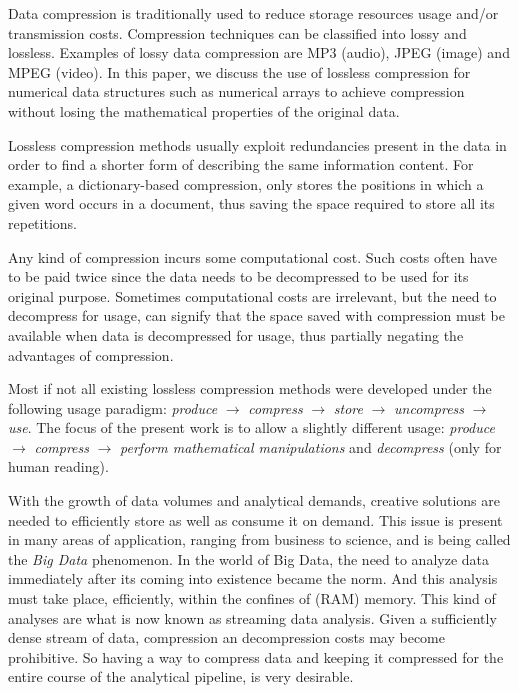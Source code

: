 \documentclass[10pt]{article}
\begin{document}
Data compression is traditionally used to reduce storage resources usage and/or 
transmission costs\cite{salomon}. Compression techniques can be classified into 
lossy and lossless. Examples of lossy data compression are MP3 (audio), JPEG 
(image) and MPEG (video). In this paper, we discuss the use of lossless 
compression for numerical data structures such as numerical arrays to achieve 
compression without losing the mathematical properties of the original data.

Lossless compression methods usually exploit redundancies present in the data in 
order to find a shorter form of describing the same information content. For 
example, a dictionary-based compression, only stores the positions in which a 
given word occurs in a document, thus saving the space required to store all its 
repetitions\cite{salomon2}.  

Any kind of compression incurs some computational cost. Such costs often have to 
be paid twice since the data needs to be decompressed to be used for its 
original purpose. Sometimes computational costs are irrelevant, but the need to 
decompress for usage, can signify that the space saved with compression must be 
available when data is decompressed for usage, thus partially negating the 
advantages of compression. 

Most if not all existing lossless compression methods were developed under the 
following usage paradigm: \textit{produce} $\rightarrow$ \textit{compress} 
$\rightarrow$ \textit{store} $\rightarrow$ \textit{uncompress} $\rightarrow$ 
\textit{use}. The focus of the present work is to allow a slightly different 
usage:  \textit{produce} $\rightarrow$ \textit{compress} $\rightarrow$ 
\textit{perform mathematical manipulations} and \textit{decompress} (only for 
human reading). 

With the growth of data volumes and analytical demands, creative solutions are 
needed to efficiently store as well as consume it on demand. This issue is 
present in many areas of application, ranging from business to 
science\cite{lynch}, and is being called the \textit{Big Data} phenomenon. In 
the world of Big Data, the need to analyze data immediately after its coming 
into existence became the norm. And this analysis must take place, efficiently, 
within the confines of (RAM) memory. This kind of analyses are what is now known 
as streaming data analysis\cite{gaber2005mining}. Given a sufficiently dense 
stream of data, compression an decompression costs may become prohibitive. So 
having a way to compress data and keeping it compressed for the entire course of 
the analytical pipeline, is very desirable. 
\end{document}
